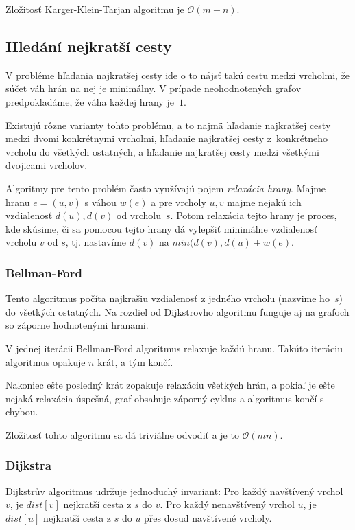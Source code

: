 Zložitosť Karger-Klein-Tarjan algoritmu je $\mathcal{O}(m+n)$.

\subsection{Hledání nejkratší cesty}

V probléme hľadania najkratšej cesty ide o to nájsť takú cestu
medzi vrcholmi, že súčet váh hrán na nej je minimálny. V prípade
neohodnotených grafov predpokladáme, že váha každej hrany je~$1$.

Existujú rôzne varianty tohto problému, a to najmä hľadanie najkratšej
cesty medzi dvomi konkrétnymi vrcholmi, hľadanie najkratšej cesty
z~konkrétneho vrcholu do všetkých ostatných, a hľadanie najkratšej
cesty medzi všetkými dvojicami vrcholov.

Algoritmy pre tento problém často využívajú pojem {\em relaxácia hrany}.
Majme hranu $e=(u,v)$ s váhou $w(e)$ a pre vrcholy $u,v$ majme nejakú
ich vzdialenosť $d(u), d(v)$ od vrcholu~$s$. Potom relaxácia tejto
hrany je proces, kde skúsime, či sa pomocou tejto hrany dá
vylepšiť minimálne vzdialenosť vrcholu $v$ od $s$, tj. nastavíme
$d(v)$ na $min(d(v),d(u)+w(e)$.

\subsubsection{Bellman-Ford}
Tento algoritmus počíta najkrašiu vzdialenosť z jedného vrcholu
(nazvime ho~$s$) do všetkých ostatných. Na rozdiel od Dijkstrovho
algoritmu funguje aj na grafoch so záporne hodnotenými hranami.

V jednej iterácii Bellman-Ford algoritmus relaxuje každú hranu.
Takúto iteráciu algoritmus opakuje $n$ krát, a tým končí. 

Nakoniec ešte posledný krát zopakuje relaxáciu všetkých hrán,
a pokiaľ je ešte nejaká relaxácia úspešná, graf obsahuje 
záporný cyklus a algoritmus končí s chybou.

Zložitosť tohto algoritmu sa dá triviálne odvodiť a je to $\mathcal{O}(mn)$.

\subsubsection{Dijkstra}
Dijkstrův algoritmus udržuje jednoduchý invariant:
Pro každý navštívený vrchol~$v$, je $dist[v]$ nejkratší cesta z $s$ do
$v$. Pro každý nenavštívený vrchol $u$, je $dist[u]$ nejkratší cesta z
$s$ do $u$ přes dosud navštívené vrcholy.

